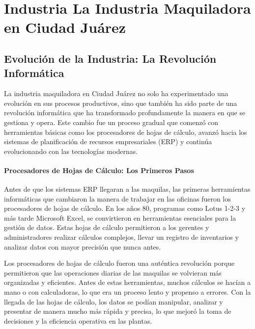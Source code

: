 \documentclass[
  10pt,
  letterpaper,
]{book}
\begin{document}

\chapter{Industria La Industria Maquiladora en Ciudad
Juárez}\label{industria-la-industria-maquiladora-en-ciudad-juuxe1rez}

\section{Evolución de la Industria: La Revolución
Informática}\label{evoluciuxf3n-de-la-industria-la-revoluciuxf3n-informuxe1tica}

La industria maquiladora en Ciudad Juárez no solo ha experimentado una
evolución en sus procesos productivos, sino que también ha sido parte de
una revolución informática que ha transformado profundamente la manera
en que se gestiona y opera. Este cambio fue un proceso gradual que
comenzó con herramientas básicas como los procesadores de hojas de
cálculo, avanzó hacia los sistemas de planificación de recursos
empresariales (ERP) y continúa evolucionando con las tecnologías
modernas.

\subsubsection{Procesadores de Hojas de Cálculo: Los Primeros
Pasos}\label{procesadores-de-hojas-de-cuxe1lculo-los-primeros-pasos}

Antes de que los sistemas ERP llegaran a las maquilas, las primeras
herramientas informáticas que cambiaron la manera de trabajar en las
oficinas fueron los procesadores de hojas de cálculo. En los años 80,
programas como Lotus 1-2-3 y más tarde Microsoft Excel, se convirtieron
en herramientas esenciales para la gestión de datos. Estas hojas de
cálculo permitieron a los gerentes y administradores realizar cálculos
complejos, llevar un registro de inventarios y analizar datos con mayor
precisión que nunca antes.

Los procesadores de hojas de cálculo fueron una auténtica revolución
porque permitieron que las operaciones diarias de las maquilas se
volvieran más organizadas y eficientes. Antes de estas herramientas,
muchos cálculos se hacían a mano o con calculadoras, lo que era un
proceso lento y propenso a errores. Con la llegada de las hojas de
cálculo, los datos se podían manipular, analizar y presentar de manera
mucho más rápida y precisa, lo que mejoró la toma de decisiones y la
eficiencia operativa en las plantas.
\end{document}
